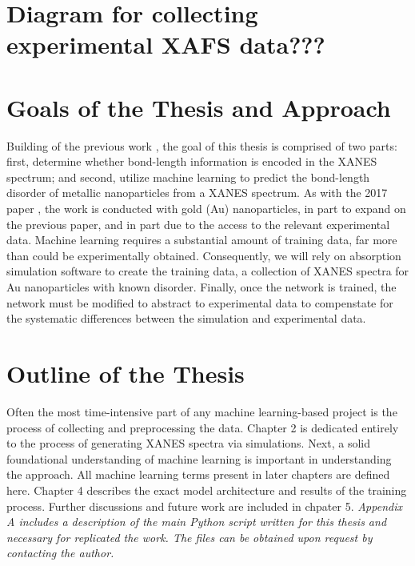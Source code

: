 \section{Diagram for collecting experimental XAFS data???}

\section{Goals of the Thesis and Approach}
Building of the previous work \cite{Timoshenko2017}, the goal of this thesis is comprised of two parts: first, determine whether bond-length information is encoded in the XANES spectrum; and second, utilize machine learning to predict the bond-length disorder of metallic nanoparticles from a XANES spectrum. As with the 2017 paper \cite{Timoshenko2017}, the work is conducted with gold (Au) nanoparticles, in part to expand on the previous paper, and in part due to the access to the relevant experimental data. Machine learning requires a substantial amount of training data, far more than could be experimentally obtained. Consequently, we will rely on absorption simulation software to create the training data, a collection of XANES spectra for Au nanoparticles with known disorder. Finally, once the network is trained, the network must be modified to abstract to experimental data to compenstate for the systematic differences between the simulation and experimental data.

\section{Outline of the Thesis}
Often the most time-intensive part of any machine learning-based project is the process of collecting and preprocessing the data. Chapter 2 is dedicated entirely to the process of generating XANES spectra via simulations. Next, a solid foundational understanding of machine learning is important in understanding the approach. All machine learning terms present in later chapters are defined here.  Chapter 4 describes the exact model architecture and results of the training process. Further discussions and future work are included in chpater 5. \textit{Appendix A includes a description of the main Python script written for this thesis and necessary for replicated the work. The files can be obtained upon request by contacting the author.}
